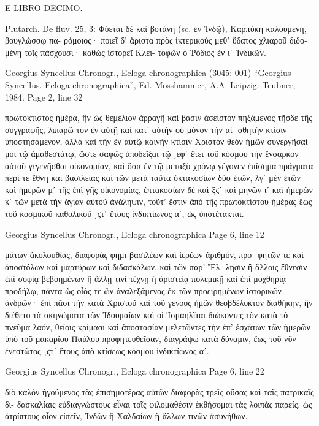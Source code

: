 \documentclass[12pt,letterpaper,twoside,final]{memoir}
\begin{document}
\begin{greek}
E LIBRO DECIMO.


 Plutarch. De fluv. 25, 3: Φύεται δὲ καὶ βοτάνη 
(sc. ἐν Ἰνδῷ), Καρπύκη καλουμένη, βουγλώσσῳ πα-
ρόμοιος· ποιεῖ δ' ἄριστα πρὸς ἰκτερικοὺς μεθ' ὕδατος 
χλιαροῦ διδομένη τοῖς πάσχουσι· καθὼς ἱστορεῖ Κλει-
τοφῶν ὁ Ῥόδιος ἐν ιʹ Ἰνδικῶν. 



Georgius Syncellus Chronogr., Ecloga chronographica (3045: 001)
“Georgius Syncellus. Ecloga chronographica”, Ed. Mosshammer, A.A.
Leipzig: Teubner, 1984.
Page 2, line 32

πρωτόκτιστος ἡμέρα, ἣν ὡς θεμέλιον ἀρραγῆ καὶ βάσιν ἄσειστον πηξάμενος 
τῆσδε τῆς συγγραφῆς, λιπαρῶ τὸν ἐν αὐτῇ καὶ κατ' αὐτὴν οὐ μόνον τὴν αἰ-
σθητὴν κτίσιν ὑποστησάμενον, ἀλλὰ καὶ τὴν ἐν αὐτῷ καινὴν κτίσιν Χριστὸν 
θεὸν ἡμῶν συνεργῆσαί μοι τῷ ἀμαθεστάτῳ, ὥστε σαφῶς ἀποδεῖξαι τῷ ͵εφʹ 
ἔτει τοῦ κόσμου τὴν ἔνσαρκον αὐτοῦ γεγενῆσθαι οἰκονομίαν, καὶ ὅσα ἐν τῷ 
μεταξὺ χρόνῳ γέγονεν ἐπίσημα πράγματα περί τε ἔθνη καὶ βασιλείας καὶ 
τῶν μετὰ ταῦτα ὀκτακοσίων δύο ἐτῶν, λγʹ μὲν ἐτῶν καὶ ἡμερῶν μʹ τῆς ἐπὶ 
γῆς οἰκονομίας, ἑπτακοσίων δὲ καὶ ξϛʹ καὶ μηνῶν ιʹ καὶ ἡμερῶν κʹ τῶν 
μετὰ τὴν ἁγίαν αὐτοῦ ἀνάληψιν, τοῦτ' ἔστιν ἀπὸ τῆς πρωτοκτίστου ἡμέρας 
ἕως τοῦ κοσμικοῦ καθολικοῦ ͵ϛτʹ ἔτους ἰνδικτίωνος αʹ, ὡς ὑποτέτακται. 



Georgius Syncellus Chronogr., Ecloga chronographica 
Page 6, line 12

μάτων ἀκολουθίας, διαφοράς φημι βασιλέων καὶ ἱερέων ἀριθμόν, προ-
φητῶν τε καὶ ἀποστόλων καὶ μαρτύρων καὶ διδασκάλων, καὶ τῶν παρ' Ἕλ-
λησιν ἢ ἄλλοις ἔθνεσιν ἐπὶ σοφίᾳ βεβοημένων ἢ ἄλλῃ τινὶ τέχνῃ ἢ ἀριστείᾳ 
πολεμικῇ καὶ ἐπὶ μοχθηρίᾳ προδήλῳ, πάντα ὡς οἷός τε ὢν ἀναλεξάμενος 
ἐκ τῶν προειρημένων ἱστορικῶν ἀνδρῶν· ἐπὶ πᾶσι τὴν κατὰ Χριστοῦ καὶ 
τοῦ γένους ἡμῶν θεοβδέλυκτον διαθήκην, ἣν διέθετο τὰ σκηνώματα τῶν 
Ἰδουμαίων καὶ οἱ Ἰσμαηλῖται διώκοντες τὸν κατὰ τὸ πνεῦμα λαόν, θείοις 
κρίμασι καὶ ἀποστασίαν μελετῶντες τὴν ἐπ' ἐσχάτων τῶν ἡμερῶν ὑπὸ 
τοῦ μακαρίου Παύλου προφητευθεῖσαν, διαγράψω κατὰ δύναμιν, ἕως τοῦ 
νῦν ἐνεστῶτος ͵ϛτʹ ἔτους ἀπὸ κτίσεως κόσμου ἰνδικτίωνος αʹ. 



Georgius Syncellus Chronogr., Ecloga chronographica 
Page 6, line 22

                                                              διὸ καλὸν ἡγούμενος 
τὰς ἐπισημοτέρας αὐτῶν διαφορὰς τρεῖς οὔσας καὶ ταῖς πατρικαῖς δι-
δασκαλίαις εὐδιαγνώστους εἶναι τοῖς φιλομαθέσιν ἐκθήσομαι τὰς λοιπὰς 
παρείς, ὡς ἀτρίπτους οἷον εἰπεῖν, Ἰνδῶν ἢ Χαλδαίων ἢ ἄλλων τινῶν 
ἀσυνήθων. 




\end{greek}
\end{document}
